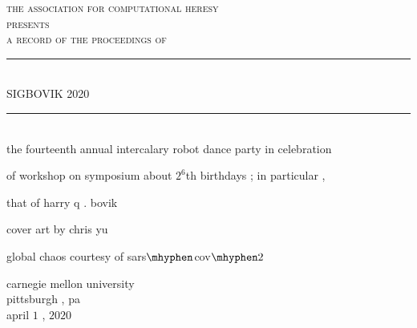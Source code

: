 \documentclass{article}
\begin{document}
\setmainfont{Splotch.ttf}
\setsansfont{Birbaslo.ttf}

\newcommand{\HRule}{\rule{\linewidth}{0.5mm}}

\begin{titlepage}
\begin{center}

\textsc{\LARGE the association for computational heresy}\\[0.5cm]

\textsc{\large presents}\\[1cm]

\textsc{\Large a record of the proceedings of}\\[0.5cm]
\HRule \\[0.4cm]
{ \Huge \sf SIGBOVIK 2020 \\[0.4cm] }

\HRule \\[2cm]


the fourteenth annual intercalary robot dance party in celebration

of workshop on symposium about $2^6$th birthdays{ ;} in particular{ ,}

that of harry q{ .} bovik

\vfill

cover art by chris yu

global chaos courtesy of sars$\mhyphen$cov$\mhyphen 2$

\vfill

{\Large carnegie mellon university\\[0.25cm]
pittsburgh{ ,} pa\\[0.3cm]
april $1${ ,} $2020$}

\end{center}
\end{titlepage}
\end{document}
